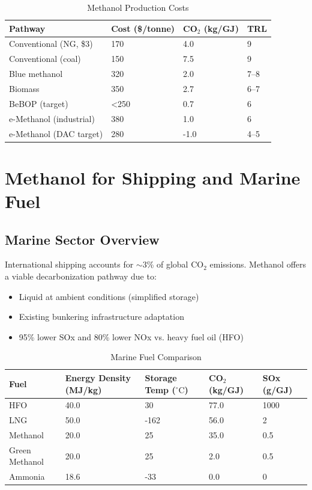 \documentclass[12pt,twoside,openany]{book}
\newcommand{\unitdegree}{\ensuremath{^\circ\mathrm{C}}}
\begin{document}
\begin{table}[htbp]
    \centering
    \caption{Methanol Production Costs}
    \label{tab:methanol_costs}
    \begin{tabular}{L{5cm} C{2.5cm} C{2cm} C{1.5cm}}
    \hline
    \textbf{Pathway} & \textbf{Cost (\$/tonne)} & \textbf{CO$_2$ (kg/GJ)} & \textbf{TRL} \\
    \hline
    Conventional (NG, \$3)     & 170   & 4.0  & 9   \\
    Conventional (coal)        & 150   & 7.5  & 9   \\
    Blue methanol              & 320   & 2.0  & 7--8 \\
    Biomass                    & 350   & 2.7  & 6--7 \\
    BeBOP (target)             & <250  & 0.7  & 6   \\
    e-Methanol (industrial)    & 380   & 1.0  & 6   \\
    e-Methanol (DAC target)    & 280   & -1.0 & 4--5 \\
    \hline
    \end{tabular}
\end{table}

\section{Methanol for Shipping and Marine Fuel}

\subsection{Marine Sector Overview}

International shipping accounts for $\sim$3\% of global CO$_2$ emissions. Methanol offers a viable decarbonization pathway due to:
\begin{itemize}
    \item Liquid at ambient conditions (simplified storage)
    \item Existing bunkering infrastructure adaptation
    \item 95\% lower SOx and 80\% lower NOx vs. heavy fuel oil (HFO)
\end{itemize}

\begin{table}[htbp]
    \centering
    \caption{Marine Fuel Comparison}
    \label{tab:marine_fuels}
    \begin{tabular}{L{3.5cm} C{2cm} C{2cm} C{2cm} C{2cm}}
    \hline
    \textbf{Fuel} & \textbf{Energy Density (MJ/kg)} & \textbf{Storage Temp (\unitdegree)} & \textbf{CO$_2$ (kg/GJ)} & \textbf{SOx (g/GJ)} \\
    \hline
    HFO           & 40.0 & 30 & 77.0 & 1000 \\
    LNG           & 50.0 & -162 & 56.0 & 2 \\
    Methanol      & 20.0 & 25 & 35.0 & 0.5 \\
    Green Methanol& 20.0 & 25 & 2.0 & 0.5 \\
    Ammonia       & 18.6 & -33 & 0.0 & 0 \\
    \hline
    \end{tabular}
\end{table}
\end{document}
